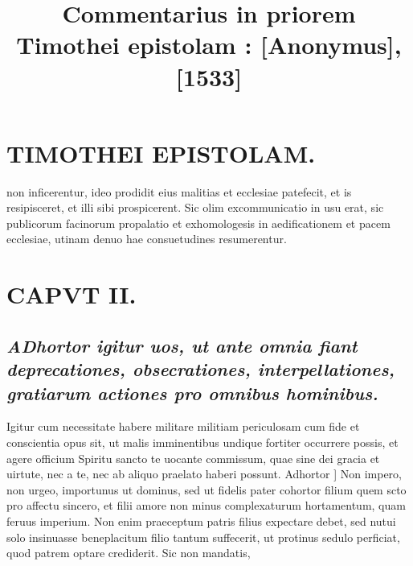 \documentclass{article}
\begin{document}
\date{}
        \title{Commentarius in priorem Timothei epistolam : [Anonymus], [1533]}
\maketitle
\tableofcontents
\clearpage
\begin{pages} 
\beginnumbering
        
\section*{TIMOTHEI EPISTOLAM. }
\marginpar{[ p.41 ]}\pstart non inficerentur, ideo prodidit eius malitias et ecclesiae patefecit, et is resipisceret, et illi sibi prospicerent. Sic olim excommunicatio in usu erat, sic publicorum facinorum propalatio et exhomologesis in aedificationem et pacem ecclesiae, utinam denuo hae consuetudines resumerentur.  \pend
\section{CAPVT II.}
{}
\subsection*{\textit{\huge\textbf{A}\normalsize Dhortor igitur uos, ut ante omnia fiant deprecationes, obsecrationes, interpellationes, gratiarum actiones pro omnibus hominibus. }}\pstart Igitur cum necessitate habere militare militiam periculosam cum fide et conscientia opus sit, ut malis imminentibus undique  fortiter occurrere possis, et agere officium Spiritu sancto te uocante commissum, quae sine dei gracia et uirtute, nec a te, nec ab aliquo praelato haberi possunt.  \pend\pstart Adhortor ] Non impero, non urgeo, importunus ut dominus, sed ut fidelis pater cohortor filium quem scto pro affectu sincero, et filii amore non minus complexaturum hortamentum, quam feruus imperium. Non enim praeceptum patris filius expectare debet, sed nutui solo insinuasse beneplacitum filio tantum suffecerit, ut protinus sedulo perficiat, quod patrem optare crediderit. Sic non mandatis,  \pend

\end{pages}
\end{document}
